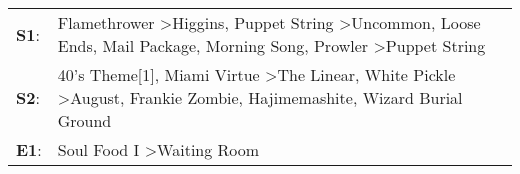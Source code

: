 \begin{supertabular}{p{0.03\textwidth}p{0.92\textwidth}}
 \textbf{S1}:  &  Flamethrower\textsuperscript{} \textgreater \enspace Higgins\textsuperscript{}, \enspace Puppet String\textsuperscript{} \textgreater \enspace Uncommon\textsuperscript{}, \enspace Loose Ends\textsuperscript{}, \enspace Mail Package\textsuperscript{}, \enspace Morning Song\textsuperscript{}, \enspace Prowler\textsuperscript{} \textgreater \enspace Puppet String\textsuperscript{}  \enspace  \\
 \textbf{S2}:  &                                     40's Theme[1]\textsuperscript{}, \enspace Miami Virtue\textsuperscript{} \textgreater \enspace The Linear\textsuperscript{}, \enspace White Pickle\textsuperscript{} \textgreater \enspace August\textsuperscript{}, \enspace Frankie Zombie\textsuperscript{}, \enspace Hajimemashite\textsuperscript{}, \enspace Wizard Burial Ground\textsuperscript{}  \enspace  \\
 \textbf{E1}:  &                                                                                                                                                                                                                                                                                                            Soul Food I\textsuperscript{} \textgreater \enspace Waiting Room\textsuperscript{}  \enspace  \\
\end{supertabular}
